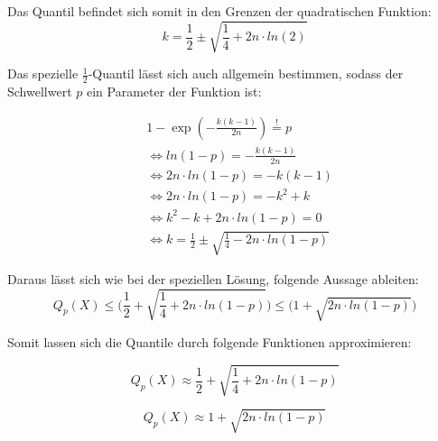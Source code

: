 \documentclass[../main.tex]{subfiles}
\begin{document}
\begin{flushleft}
Das Quantil befindet sich somit in den Grenzen der quadratischen Funktion:
\begin{equation}
 k = \frac{ 1 }{ 2 } \pm \sqrt{ \frac{ 1 }{ 4 } + 2n\cdot ln(2)}
\end{equation}

Das spezielle $ \frac{1}{2} $-Quantil lässt sich auch allgemein bestimmen, sodass der Schwellwert $p$ ein Parameter der Funktion ist:

\begin{align*}
& 1 - \exp(-\frac{ k(k-1) }{ 2n }) \overset{!}{=} p \\
& \Leftrightarrow ln(1-p) = -\frac{ k(k-1)}{ 2n } \\
& \Leftrightarrow 2n\cdot ln(1-p) = -k(k-1) \\
& \Leftrightarrow 2n\cdot ln(1-p) = -k^{ 2 } + k \\
& \Leftrightarrow k^{ 2 } - k + 2n\cdot ln(1-p) = 0 \\
& \Leftrightarrow k = \frac{ 1 }{ 2 } \pm \sqrt{ \frac{ 1 }{ 4 } - 2n\cdot ln(1-p)}
\end{align*}

Daraus lässt sich wie bei der speziellen Lösung, folgende Aussage ableiten:
\begin{equation}
Q_{ p }(X) \leq \bigg( \frac{ 1 }{ 2 } + \sqrt{ \frac{ 1 }{ 4 } + 2n\cdot ln(1-p)} \bigg) \leq \bigg(1+\sqrt{ 2n\cdot ln(1-p) }\bigg)
\end{equation}

Somit lassen sich die Quantile durch folgende Funktionen approximieren:

\begin{equation}
Q_{ p }(X) \approx \frac{ 1 }{ 2 } + \sqrt{ \frac{ 1 }{ 4 } + 2n\cdot ln(1-p)}
\end{equation}

\begin{equation}
Q_{ p }(X) \approx 1+\sqrt{ 2n\cdot ln(1-p) }
\end{equation}







\end{flushleft}
\end{document}
